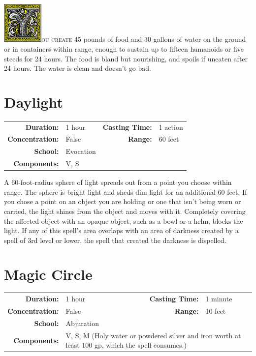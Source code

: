 \documentclass[12pt,showtrims]{memoir}
\begin{document}
\vspace{1\baselineskip}\noindent 
\lettrine[lines=4]{\includegraphics[height=58pt]{initials/Y.png}}{ou create 45} pounds of food and 30 gallons of water on the ground or in containers within range, enough to sustain up to fifteen humanoids or five steeds for 24 hours. The food is bland but nourishing, and spoils if uneaten after 24 hours. The water is clean and doesn't go bad.

\newpage
\section*{Daylight}

{
\small\centering\vspace{-6pt}
\begin{tabular}{rlrl}
\toprule

\textbf{Duration:} & 1 hour &
\textbf{Casting Time:} & 1 action \\
\textbf{Concentration:} & False &
\textbf{Range:} & 60 feet \\
\textbf{School:} & Evocation \\
\textbf{Components:} & \multicolumn{3}{p{0.7\textwidth}}{V, S}\\

\bottomrule
\end{tabular}
}

\vspace{1\baselineskip}\noindent A 60-foot-radius sphere of light spreads out from a point you choose within range. The sphere is bright light and sheds dim light for an additional 60 feet. If you chose a point on an object you are holding or one that isn't being worn or carried, the light shines from the object and moves with it. Completely covering the affected object with an opaque object, such as a bowl or a helm, blocks the light. If any of this spell's area overlaps with an area of darkness created by a spell of 3rd level or lower, the spell that created the darkness is dispelled.

\newpage
\section*{Magic Circle}

{
\small\centering\vspace{-6pt}
\begin{tabular}{rlrl}
\toprule

\textbf{Duration:} & 1 hour &
\textbf{Casting Time:} & 1 minute \\
\textbf{Concentration:} & False &
\textbf{Range:} & 10 feet \\
\textbf{School:} & Abjuration \\
\textbf{Components:} & \multicolumn{3}{p{0.7\textwidth}}{V, S, M (Holy water or powdered silver and iron worth at least 100 gp, which the spell consumes.)}\\

\bottomrule
\end{tabular}
}
\end{document}
